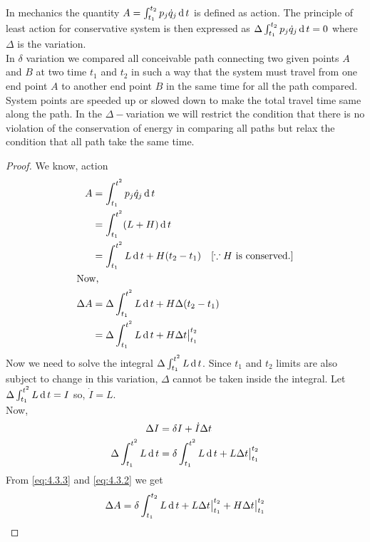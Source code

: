 \documentclass[12pt]{article}
\begin{document}
\begin{soln}
    In mechanics the quantity \(A=\int_{t_1}^{t_2}p_j \dot{q}_j \,\mathrm{d}\, t\) is defined as action. The principle of least action for conservative system is then expressed as \(\Delta \int_{t_1}^{t_2}p_j \dot{q}_j \,\mathrm{d}\, t=0\) where \(\Delta\) is the variation.\\
    In \(\delta\) variation we compared all conceivable path connecting two given points \(A\) and \(B\) at two time \(t_1 \) and \(t_2\) in such a way that the system must travel from one end point \(A\) to another end point \(B\) in the same time for all the path compared. System points are speeded up or slowed down to make the total travel time same along the path. In the \(\Delta-\)variation we will restrict the condition that there is no violation of the conservation of energy in comparing all paths but relax the condition that all path take the same time.
    \begin{proof}
        We know, action
        \begin{align}
            A&= \int_{t_1}^{t^2} p_j \dot{q}_j \,\mathrm{d}\, t\notag\\
            &= \int_{t_1}^{t^2} (L+H) \,\mathrm{d}\, t\notag\\
            &= \int_{t_1}^{t^2} L \,\mathrm{d}\, t+H(t_2-t_1)\quad[\because H \text{ is conserved.}] \label{eq:4.3.1}\\
            \intertext{Now,}
            \Delta A&= \Delta\int_{t_1}^{t^2} L \,\mathrm{d}\, t+H\Delta(t_2-t_1)\notag\\
            &= \Delta\int_{t_1}^{t^2} L \,\mathrm{d}\, t+H\Delta t\big\vert_{t_1}^{t_2} \label{eq:4.3.2}
        \end{align}
        Now we need to solve the integral \(\Delta\int_{t_1}^{t^2} L \,\mathrm{d}\, t\). Since \(t_1\) and \(t_2\) limits are also subject to change in this variation, \(\Delta\) cannot be taken inside the integral. Let \(\Delta\int_{t_1}^{t^2} L \,\mathrm{d}\, t=I\) so, \(\dot{I}=L\).\\
        Now, 
        \begin{align}
            \Delta I&= \delta I+\dot{I} \Delta t\notag\\
            \Delta\int_{t_1}^{t^2} L \,\mathrm{d}\, t&= \delta \int_{t_1}^{t^2} L \,\mathrm{d}\, t+L\Delta t\big\vert_{t_1}^{t_2}\label{eq:4.3.3}
        \end{align}
        From \eqref{eq:4.3.3} and \eqref{eq:4.3.2} we get
        \begin{equation}
            \Delta A =\delta \int_{t_1}^{t_2} L \D t+L\Delta t\big\vert_{t_1}^{t_2}+H\Delta t\big\vert_{t_1}^{t_2} \label{eq:4.3.4}

\end{equation}
\end{proof}
\end{soln}
\end{document}
